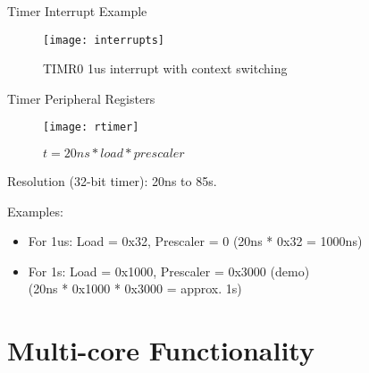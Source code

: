 \documentclass[aspectratio=169]{beamer}
\begin{document}
\begin{frame}{Timer Interrupt Example}
    \begin{figure}
        \centering
        \texttt{[image: interrupts]}
        \caption{TIMR0 1us interrupt with context switching}
        \label{fig:my_label}
    \end{figure}
\end{frame}

\begin{frame}{Timer Peripheral Registers}
    \begin{figure}
        \centering
        \texttt{[image: rtimer]}
        \caption{$t = 20{ns} * {load} * {prescaler}$}
        \label{fig:my_label}
    \end{figure}
    Resolution (32-bit timer): 20ns to 85s.
    
    Examples: 
    \begin{itemize}
        \item For 1us: Load = 0x32, Prescaler = 0 (20ns * 0x32 = 1000ns)
        \item For 1s:  Load = 0x1000, Prescaler = 0x3000 (demo)\\(20ns * 0x1000 * 0x3000 = approx. 1s)
    \end{itemize}
\end{frame}

\section{Multi-core Functionality}
\frame{\tableofcontents[currentsection, subsectionstyle=show/show/hide]}
\end{document}
